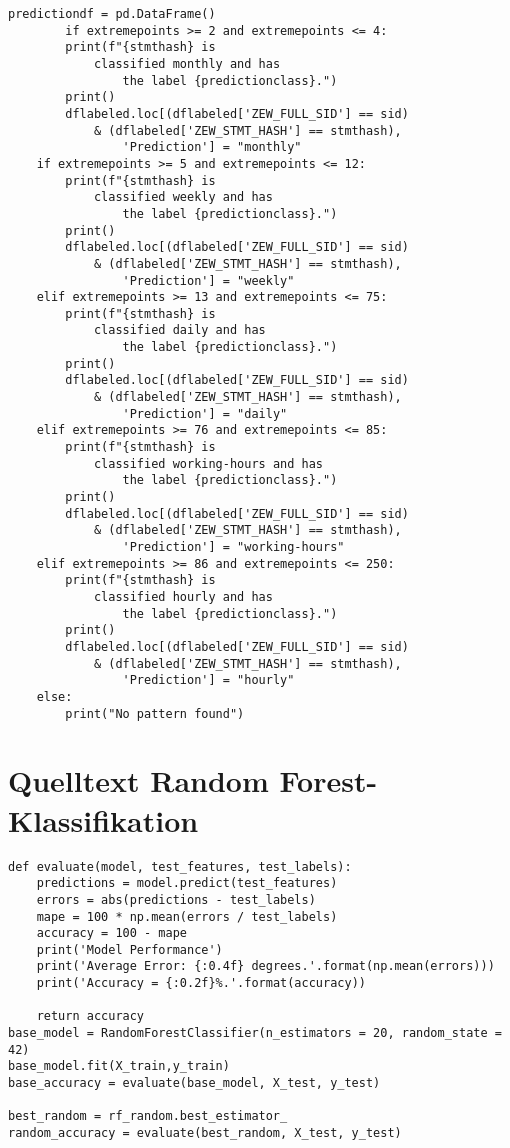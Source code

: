 \begin{lstlisting}[caption={\texttt{Quelltext TSD-Klassifikation}},captionpos=b]
	predictiondf = pd.DataFrame()
		if extremepoints >= 2 and extremepoints <= 4:
		print(f"{stmthash} is 
			classified monthly and has 
				the label {predictionclass}.")
		print()
		dflabeled.loc[(dflabeled['ZEW_FULL_SID'] == sid) 
			& (dflabeled['ZEW_STMT_HASH'] == stmthash), 
				'Prediction'] = "monthly"
	if extremepoints >= 5 and extremepoints <= 12:
		print(f"{stmthash} is 
			classified weekly and has 
				the label {predictionclass}.")
		print()
		dflabeled.loc[(dflabeled['ZEW_FULL_SID'] == sid) 
			& (dflabeled['ZEW_STMT_HASH'] == stmthash), 
				'Prediction'] = "weekly"
	elif extremepoints >= 13 and extremepoints <= 75:
		print(f"{stmthash} is 
			classified daily and has 
				the label {predictionclass}.")
		print()
		dflabeled.loc[(dflabeled['ZEW_FULL_SID'] == sid) 
			& (dflabeled['ZEW_STMT_HASH'] == stmthash), 
				'Prediction'] = "daily"
	elif extremepoints >= 76 and extremepoints <= 85:
		print(f"{stmthash} is 
			classified working-hours and has 
				the label {predictionclass}.")
		print()
		dflabeled.loc[(dflabeled['ZEW_FULL_SID'] == sid) 
			& (dflabeled['ZEW_STMT_HASH'] == stmthash), 
				'Prediction'] = "working-hours"
	elif extremepoints >= 86 and extremepoints <= 250:
		print(f"{stmthash} is 
			classified hourly and has 
				the label {predictionclass}.")
		print()
		dflabeled.loc[(dflabeled['ZEW_FULL_SID'] == sid) 
			& (dflabeled['ZEW_STMT_HASH'] == stmthash), 
				'Prediction'] = "hourly"
	else:
		print("No pattern found")
\end{lstlisting}

\section{Quelltext Random Forest-Klassifikation}

\begin{lstlisting}[caption={\texttt{Quelltext Random Forest-Klassifikation}},captionpos=b]
def evaluate(model, test_features, test_labels):
	predictions = model.predict(test_features)
	errors = abs(predictions - test_labels)
	mape = 100 * np.mean(errors / test_labels)
	accuracy = 100 - mape
	print('Model Performance')
	print('Average Error: {:0.4f} degrees.'.format(np.mean(errors)))
	print('Accuracy = {:0.2f}%.'.format(accuracy))
	
	return accuracy
base_model = RandomForestClassifier(n_estimators = 20, random_state = 42)
base_model.fit(X_train,y_train)
base_accuracy = evaluate(base_model, X_test, y_test)

best_random = rf_random.best_estimator_
random_accuracy = evaluate(best_random, X_test, y_test)
\end{lstlisting}